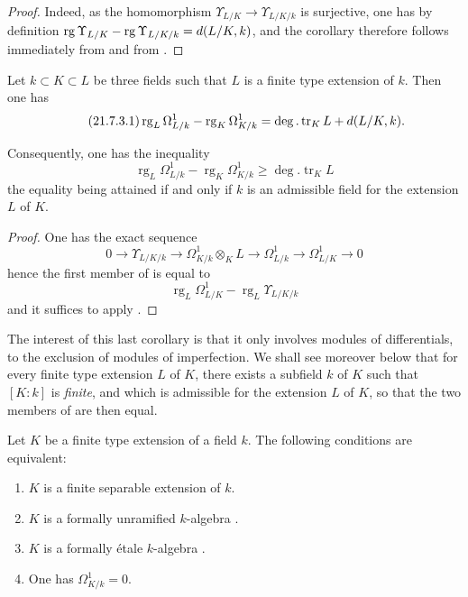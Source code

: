 \begin{proof}
Indeed, as the homomorphism $\Upsilon_{L/K}\to\Upsilon_{L/K/k}$ is surjective, one has by definition  $\operatorname{rg}\Upsilon_{L/K}-\operatorname{rg}\Upsilon_{L/K/k}=d(L/K,k)$, and the corollary therefore follows immediately from  and from .
\end{proof}

\begin{corollary}[21.7.3]
\label{0.21.7.3}
Let $k\subset K\subset L$ be three fields such that $L$ is a finite type extension of $k$.
Then one has
\begin{equation}
\tag{21.7.3.1}
  \label{0.21.7.3.1}
  \operatorname{rg}_L\Omega^1_{L/k}-\operatorname{rg}_K\Omega^1_{K/k}=\deg.\operatorname{tr}_K L+d(L/K,k).
\end{equation}

Consequently, one has the inequality
\begin{equation}
\tag{21.7.3.2}
  \label{0.21.7.3.2}
  \operatorname{rg}_L\Omega^1_{L/k}-\operatorname{rg}_K\Omega^1_{K/k}\geqslant\deg.\operatorname{tr}_K L
\end{equation}
the equality being attained if and only if $k$ is an admissible field for the extension $L$ of $K$.
\end{corollary}

\begin{proof}
One has the exact sequence 
\[
  0\to\Upsilon_{L/K/k}\to\Omega^1_{K/k}\otimes_K L\to\Omega^1_{L/k}\to\Omega^1_{L/K}\to 0
\]
hence the first member of  is equal to
\[
  \operatorname{rg}_L\Omega^1_{L/K}-\operatorname{rg}_L\Upsilon_{L/K/k}
\]
and it suffices to apply .
\end{proof}

The interest of this last corollary is that it only involves modules of differentials, to the exclusion of modules of imperfection.
We shall see moreover below  that for every finite type extension $L$ of $K$, there exists a subfield $k$ of $K$ such that $[K:k]$ is \emph{finite}, and which is admissible for the extension $L$ of $K$, so that the two members of  are then equal.

\begin{corollary}[21.7.4]
\label{0.21.7.4}
Let $K$ be a finite type extension of a field $k$.
The following conditions are equivalent:
\begin{enumerate}
  \item[\rm a)] $K$ is a finite separable extension of $k$.
  \item[\rm b)] $K$ is a formally unramified $k$-algebra .
  \item[\rm c)] $K$ is a formally \'etale $k$-algebra .
  \item[\rm d)] One has $\Omega^1_{K/k}=0$.
\end{enumerate}
\end{corollary}

